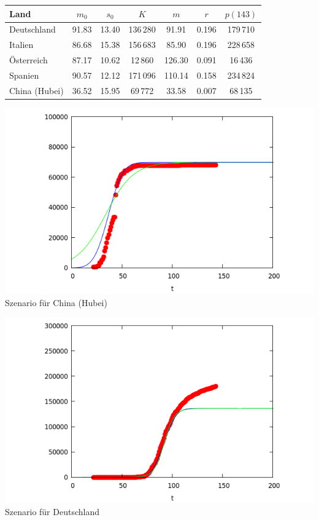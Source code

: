 \documentclass[a4paper,11pt]{article}
\begin{document}
\begin{center}
  \begin{tabular}{|l|c|c|c|c|c|c|}\hline
    Land & $m_0$ & $s_0$ & $K$ & $m$ & $r$ & $p(143)$\\\hline
    Deutschland & 91.83 & 13.40 & 136\,280 & 91.91 & 0.196 & 179\,710\\
    Italien     & 86.68 & 15.38 & 156\,683 & 85.90 & 0.196 & 228\,658\\
    Österreich  & 87.17 & 10.62 &  12\,860 &126.30 & 0.091 &  16\,436\\
    Spanien     & 90.57 & 12.12 & 171\,096 &110.14 & 0.158 & 234\,824\\
  China (Hubei) & 36.52 & 15.95 &  69\,772 & 33.58 & 0.007 &  68\,135\\\hline
  \end{tabular}

  \begin{minipage}{.48\textwidth}\centering
    \includegraphics[width=\textwidth]{China-1.png}\\[1em]
                    {Szenario für China (Hubei)}
  \end{minipage}\hfill
  \begin{minipage}{.48\textwidth}\centering
    \includegraphics[width=\textwidth]{Germany-1.png}\\[1em]
                    {Szenario für Deutschland}
  \end{minipage}
\end{center}
\end{document}
